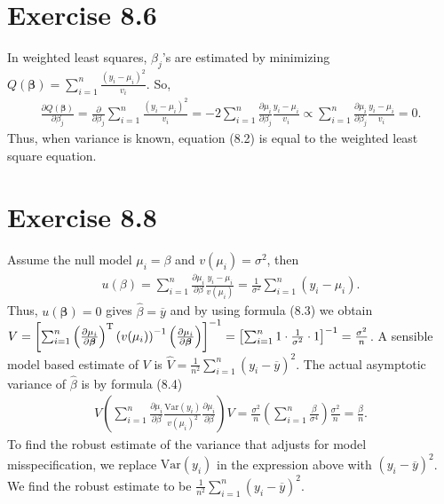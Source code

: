 \documentclass[a4paper]{article}
\newcommand{\Var}{\mathrm{Var}}
\begin{document}
\vspace{\baselineskip}
\section{Exercise 8.6}
In weighted least squares, $\beta_{j}$'s are estimated by minimizing $Q(\bm{\beta}) = \sum_{i=1}^{n} \frac{(y_{i} - \mu_{i})^{2}}{v_{i}}$. So,
\begin{align*}
\frac{\partial Q(\bm{\beta})}{\partial \beta_{j}} = \frac{\partial}{\partial \beta_{j}}\sum_{i=1}^{n} \frac{(y_{i} - \mu_{i})^{2}}{v_{i}} = -2\sum_{i=1}^{n} \frac{\partial \mu_{i}}{\partial \beta_{j}} \frac{y_{i}-\mu_{i}}{v_{i}} \propto \sum_{i=1}^{n} \frac{\partial \mu_{i}}{\partial \beta_{j}} \frac{y_{i}-\mu_{i}}{v_{i}} = 0.
\end{align*}
Thus, when variance is known, equation (8.2) is equal to the weighted least square equation.



\vspace{\baselineskip}
\section{Exercise 8.8}
Assume the null model $\mu_{i} = \beta$ and $v(\mu_{i}) = \sigma^{2}$, then
\begin{align*}
u(\beta) = \sum_{i=1}^{n}\frac{\partial \mu_{i}}{\partial \beta} \frac{y_{i}-\mu_{i}}{v(\mu_{i})} = \frac{1}{\sigma^{2}} \sum_{i=1}^{n}(y_{i}-\mu_{i}).
\end{align*}
Thus, $u(\bm{\beta}) = 0$ gives $\widehat{\beta} = \overline{y}$ and by using formula (8.3) we obtain $V = \left[\sum_{i=1}^{n}\left(\frac{\partial \mu_{i}}{\partial \bm{\beta}}\right)^{\rm T}\left(v(\mu_{i})\right)^{-1}\left(\frac{\partial \mu_{i}}{\partial \bm{\beta}}\right)\right]^{-1} = \left[\sum_{i=1}^{n}1 \cdot \frac{1}{\sigma^{2}} \cdot 1\right]^{-1} = \frac{\sigma^{2}}{n}$. A sensible model based estimate of $V$ is $\widehat{V} = \frac{1}{n^{2}}\sum_{i=1}^{n}(y_{i}-\overline{y})^{2}$. The actual asymptotic variance of $\widehat{\beta}$ is by formula (8.4)
\begin{align*}
V\left(\sum_{i=1}^{n}\frac{\partial \mu_{i}}{\partial \beta}\frac{\Var(y_{i})}{v(\mu_{i})^{2}}\frac{\partial \mu_{i}}{\partial \beta}\right)V = \frac{\sigma^{2}}{n}\left(\sum_{i=1}^{n}\frac{\beta}{\sigma^{4}}\right)\frac{\sigma^{2}}{n} = \frac{\beta}{n}.
\end{align*}
To find the robust estimate of the variance that adjusts for model misspecification, we replace $\Var(y_{i})$ in the expression above with $(y_{i}-\overline{y})^{2}$. We find the robust estimate to be $\frac{1}{n^{2}}\sum_{i=1}^{n}(y_{i}-\overline{y})^{2}$.
\end{document}
